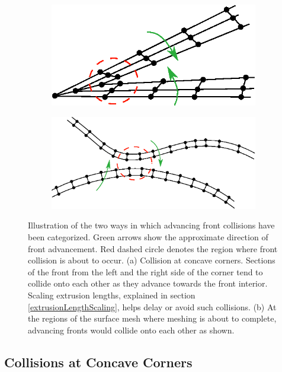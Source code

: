 \begin{figure}
\centering
\begin{subfigure}{0.5\textwidth}
\includegraphics[width=0.9\linewidth]{img/m2/cornerCollision/cornerCollisionIllustration.eps}
\caption{}
\label{fig-cornerCollisionIllustration}
\end{subfigure}%
\begin{subfigure}{0.5\textwidth}
\includegraphics[width =0.9\linewidth]{img/m2/headOnCollision/headOnCollisionIllustration.eps}
\caption{}
\label{fig-headOnCollisionIllustration}
\end{subfigure}
\caption{Illustration of the two ways in which advancing front collisions have been categorized. Green arrows show the approximate direction of front advancement. Red dashed circle denotes the region where front collision is about to occur. (a) Collision at concave corners. Sections of the front from the left and the right side of the corner tend to collide onto each other as they advance towards the front interior. Scaling extrusion lengths, explained in section \ref{extrusionLengthScaling}, helps delay or avoid such collisions. (b) At the regions of the surface mesh where meshing is about to complete, advancing fronts would collide onto each other as shown.}
\label{fig-collisionIllustration}
\end{figure}

\subsection{Collisions at Concave Corners}
\label{collisionConcaveCorner}

